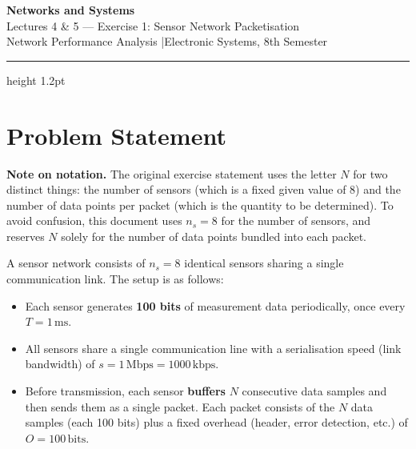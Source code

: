\documentclass[12pt, a4paper]{article}
\begin{document}
\begin{center}
  {\LARGE\bfseries\color{headernavy} Networks and Systems}\\[4pt]
  {\large Lectures 4 \& 5 --- Exercise 1: Sensor Network Packetisation}\\[2pt]
  {\normalsize Network Performance Analysis \quad|\quad Electronic Systems, 8th Semester}
\end{center}

\vspace{4pt}\hrule height 1.2pt\vspace{12pt}

\section*{Problem Statement}

\begin{notebox}
\textbf{Note on notation.}
The original exercise statement uses the letter $N$ for two distinct things: the
number of sensors (which is a fixed given value of 8) and the number of data
points per packet (which is the quantity to be determined). To avoid confusion,
this document uses $n_s = 8$ for the number of sensors, and reserves $N$ solely
for the number of data points bundled into each packet.
\end{notebox}

\vspace{4pt}
A sensor network consists of $n_s = 8$ identical sensors sharing a single
communication link. The setup is as follows:

\begin{itemize}[leftmargin=1.4em, itemsep=4pt]
  \item Each sensor generates \textbf{100 bits} of measurement data periodically,
    once every $T = 1\,\mathrm{ms}$.
  \item All sensors share a single communication line with a serialisation speed
    (link bandwidth) of $s = 1\,\mathrm{Mbps} = 1000\,\mathrm{kbps}$.
  \item Before transmission, each sensor \textbf{buffers} $N$ consecutive data
    samples and then sends them as a single packet. Each packet consists of the
    $N$ data samples (each 100 bits) plus a fixed overhead (header, error
    detection, etc.) of $O = 100\,\mathrm{bits}$.
\end{itemize}
\end{document}
